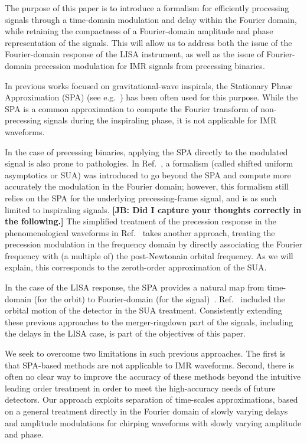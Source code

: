 \documentclass[aps,showpacs,twocolumn,
prd,superscriptaddress,nofootinbib]{revtex4-1}
\newcommand{\jgb}[1]{{\color{DarkGreen} #1}}
\begin{document}
The purpose of this paper is to introduce a formalism for efficiently processing signals through a time-domain modulation and delay within the Fourier domain, while retaining the compactness of a Fourier-domain amplitude and phase representation of the signals. This will allow us to address both the issue of the Fourier-domain response of the LISA instrument, as well as the issue of Fourier-domain precession modulation for IMR signals from precessing binaries.

In previous works focused on gravitational-wave inspirals, the Stationary Phase Approximation (SPA) (see e.g.~\cite{Thorne300, CF94}) has been often used for this purpose. While the SPA is a common approximation to compute the Fourier transform of non-precessing signals during the inspiraling phase, it is not applicable for IMR waveforms.

\jgb{In the case of precessing binaries, applying the SPA directly to the modulated signal is also prone to pathologies. In Ref.~\cite{KCY13,KCY14}, a formalism (called shifted uniform asymptotics or SUA) was introduced to go beyond the SPA and compute more accurately the modulation in the Fourier domain; however, this formalism still relies on the SPA for the underlying precessing-frame signal, and is as such limited to inspiraling signals. \textbf{[JB: Did I capture your thoughts correctly in the following.]}
The simplified treatment of the precession response in the phenomenological waveforms in Ref.~\cite{Hannam+13} takes another approach, treating the precession modulation in the frequency domain by directly associating the Fourier frequency with (a multiple of) the post-Newtonain orbital frequency. As we will explain, this corresponds to the zeroth-order approximation of the SUA.}

In the case of the LISA response, the SPA provides a natural map from time-domain (for the orbit) to Fourier-domain (for the signal)~\cite{Cutler97}. Ref.~\cite{Klein+15} included the orbital motion of the detector in the SUA treatment. Consistently extending these previous approaches to the merger-ringdown part of the signals, including the delays in the LISA case, is part of the objectives of this paper.

We seek to overcome two limitations in such previous approaches.  The first is that  SPA-based methods are not applicable to IMR waveforms. Second, there is often no clear way to improve the accuracy of these methods beyond the intuitive leading order treatment in order to meet the high-accuracy needs of future detectors. Our approach exploits separation of time-scales approximations, based on a general treatment directly in the Fourier domain of slowly varying delays and amplitude modulations for chirping waveforms with slowly varying amplitude and phase.
\end{document}
